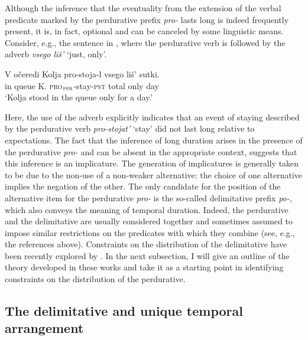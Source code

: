 \documentclass[output=paper,
]{langscibook}
\begin{document}
Although the inference that the eventuality from the extension of the verbal predicate marked by the perdurative prefix \textit{pro-} lasts long is indeed frequently present, it is, in fact, optional and can be canceled by some linguistic means. Consider, e.g., the sentence in , where the perdurative verb is followed by the adverb \textit{vsego liš’} `just, only'.


\ea \label{ex:naumov:21}
\gll  V	očeredi		Kolja	pro-stoja-l		vsego	liš’	sutki.\\
in	queue		K.	\textsc{pro}$_\textsc{per}$-stay-\textsc{pst} total	only	day \\
\glt `Kolja stood in the queue only for a day.'
\z

\noindent Here, the use of the adverb explicitly indicates that an event of staying described by the perdurative verb \textit{pro-stojat’} `stay' did not last long relative to expectations. The fact that the inference of long duration arises in the presence of the perdurative \textit{pro-} and can be absent in the appropriate context, suggests that this inference is an implicature. The generation of implicatures is generally taken to be due to the non-use of a non-weaker alternative: the choice of one alternative implies the negation of the other. The only candidate for the position of the alternative item for the perdurative \textit{pro-} is the so-called delimitative prefix \textit{po-}, which also conveys the meaning of temporal duration. Indeed, the perdurative and the delimitative are usually considered together and sometimes assumed to impose similar restrictions on the predicates with which they combine (see, e.g., the references above). Constraints on the distribution of the delimitative have been recently explored by \citet{tatevosov2017temporal}. In the next subsection, I will give an outline of the theory developed in these works and take it as a starting point in identifying constraints on the distribution of the perdurative. 

\subsection{The delimitative and unique temporal arrangement} \label{sec:naumov:3.3}
\end{document}
